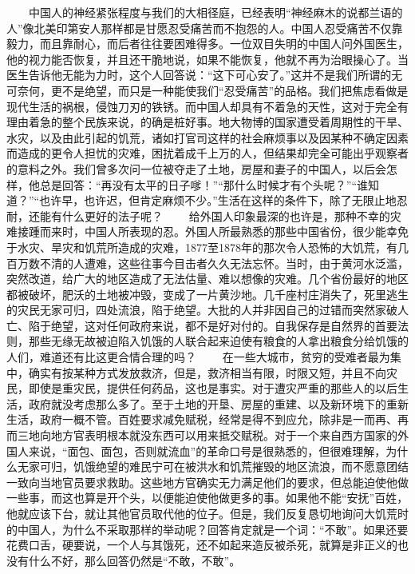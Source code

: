 \documentclass[12pt,oneside]{book}
\begin{document}
\begin{common-format}
　　中国人的神经紧张程度与我们的大相径庭，已经表明“神经麻木的说都兰语的人”像北美印第安人那样都是甘愿忍受痛苦而不抱怨的人。中国人忍受痛苦不仅靠毅力，而且靠耐心，而后者往往要困难得多。一位双目失明的中国人问外国医生，他的视力能否恢复，并且还干脆地说，如果不能恢复，他就不再为治眼操心了。当医生告诉他无能为力时，这个人回答说：“这下可心安了。”这并不是我们所谓的无可奈何，更不是绝望，而只是一种能使我们“忍受痛苦”的品格。我们把焦虑看做是现代生活的祸根，侵蚀刀刃的铁锈。而中国人却具有不着急的天性，这对于完全有理由着急的整个民族来说，的确是桩好事。地大物博的国家遭受着周期性的干旱、水灾，以及由此引起的饥荒，诸如打官司这样的社会麻烦事以及因某种不确定因素而造成的更令人担忧的灾难，困扰着成千上万的人，但结果却完全可能出乎观察者的意料之外。我们曾多次问一位被夺走了土地，房屋和妻子的中国人，以后会怎样，他总是回答：“再没有太平的日子嗲！”“那什么时候才有个头呢？”“谁知道？”“也许早，也许迟，但肯定麻烦不少。”生活在这样的条件下，除了无限止地忍耐，还能有什么更好的法子呢？ 
　　给外国人印象最深的也许是，那种不幸的灾难接踵而来时，中国人所表现的忍。外国人所最熟悉的那些中国省份，很少能幸免于水灾、旱灾和饥荒所造成的灾难，1877至1878年的那次令人恐怖的大饥荒，有几百万数不清的人遭难，这些往事今目击者久久无法忘怀。当时，由于黄河水泛滥，突然改道，给广大的地区造成了无法估量、难以想像的灾难。几个省份最好的地区都被破坏，肥沃的土地被冲毁，变成了一片黄沙地。几千座村庄消失了，死里逃生的灾民无家可归，四处流浪，陷于绝望。大批的人并非因自己的过错而突然家破人亡、陷于绝望，这对任何政府来说，都不是好对付的。自我保存是自然界的首要法则，那些无缘无故被迫陷入饥饿的人联合起来迫使有粮食的人拿出粮食分给饥饿的人们，难道还有比这更合情合理的吗？ 
　　在一些大城市，贫穷的受难者最为集中，确实有按某种方式发放救济，但是，救济相当有限，时限又短，并且不向灾民，即使是重灾民，提供任何药品，这也是事实。对于遭灾严重的那些人的以后生活，政府就没考虑那么多了。至于土地的开垦、房屋的重建、以及新环境下的重新生活，政府一概不管。百姓要求减免赋税，经常是得不到应允，除非是一而再、再而三地向地方官表明根本就没东西可以用来抵交赋税。对于一个来自西方国家的外国人来说，“面包、面包，否则就流血”的革命口号是很熟悉的，但很难理解，为什么无家可归，饥饿绝望的难民宁可在被洪水和饥荒摧毁的地区流浪，而不愿意团结一致向当地官员要求救助。这些地方官确实无力满足他们的要求，但总能迫使他做一些事，而这也算是开个头，以便能迫使他做更多的事。如果他不能“安抚”百姓，他就应该下台，就让其他官员取代他的位子。但是，我们反复恳切地询问大饥荒时的中国人，为什么不采取那样的举动呢？回答肯定就是一个词：“不敢”。如果还要花费口舌，硬要说，一个人与其饿死，还不如起来造反被杀死，就算是非正义的也没有什么不好，那么回答仍然是“不敢，不敢”。 

\end{common-format}
\end{document}
